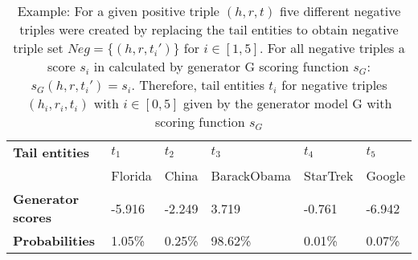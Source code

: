 \begin{table}[h]
    \centering
    \begin{tabular}{llllll}
        \toprule
        
        \textbf{Tail entities}
        & \textbf{$t_1$} & \textbf{$t_2$} & \textbf{$t_3$} & \textbf{$t_4$} & \textbf{$t_5$} \\
         
        & Florida
        & China
        & BarackObama
        & StarTrek
        & Google  \\

        \midrule
        
        \textbf{Generator scores}
        & -5.916 
        & -2.249  
        & 3.719 
        & -0.761 
        & -6.942 \\
        
         \midrule
        
        \textbf{Probabilities}
        & 1.05\%
        & 0.25\% 
        & 98.62\%  
        & 0.01\% 
        & 0.07\%
        \\
        \bottomrule
    \end{tabular}
    \caption{Example: For a given positive triple $(h,r,t)$ five different negative triples were created by replacing the tail entities to obtain negative triple set 
    $Neg = \{(h,r,t_i')\}$ for $i \in [1,5]$.
    For all negative triples a score $s_i$ in calculated by generator G scoring function $s_G$: $s_G(h,r,t_i') = s_i$.
    Therefore, tail entities $t_i$ for negative triples $(h_i, r_i, t_i)$ with $i \in [0,5]$ given by the generator model G with scoring function $s_G$ }
\label{tab:generator_scores}
\end{table}
